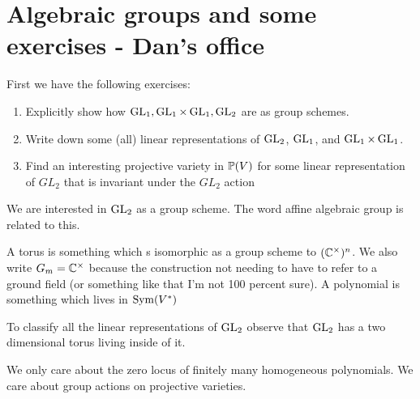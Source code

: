 \documentclass[12pt]{article}
\begin{document}
\section{Algebraic groups and some exercises - Dan's office}
First we have the following exercises: \begin{enumerate}
    \item Explicitly show how $\GL_1,\GL_1\times\GL_1,\GL_2$ are as group schemes.
    \item Write down some (all) linear representations of $\GL_2$, $\GL_1$, and $\GL_1\times\GL_1$. 
    \item Find an interesting projective variety in $\P(V)$ for some linear representation of $GL_2$ that is invariant under the $ GL_2$ action


\end{enumerate}
We are interested in $\GL_2$ as a group scheme. The word affine algebraic group is related to this. 

\hfill

A torus is something which s isomorphic as a group scheme to $(\C^\times)^n$. We also write $G_m = \C^\times$ because the construction not needing to have to refer to a ground field (or something like that I'm not 100 percent sure). A polynomial is something which lives in $\Sym(V^*)$

\hfill

To classify all the linear representations of $\GL_2$ observe that $\GL_2$ has a two dimensional torus living inside of it.

\hfill

We only care about the zero locus of finitely many homogeneous polynomials. We care about group actions on projective varieties.
\end{document}
